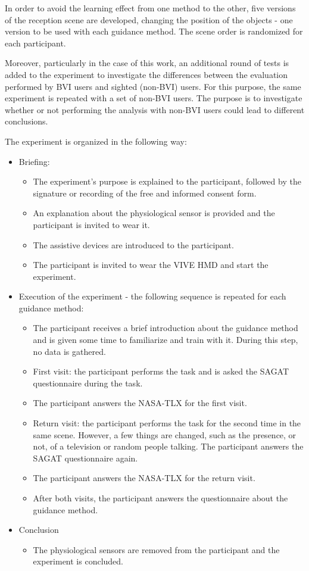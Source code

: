 In order to avoid the learning effect from one method to the other, five versions of the reception scene are developed, changing the position of the objects - one version to be used with each guidance method. The scene order is randomized for each participant.

Moreover, particularly in the case of this work, an additional round of tests is added to the experiment to investigate the differences between the evaluation performed by BVI users and sighted (non-BVI) users. For this purpose, the same experiment is repeated with a set of non-BVI users. The purpose is to investigate whether or not performing the analysis with non-BVI users could lead to different conclusions.

The experiment is organized in the following way:

\begin{itemize}
    \item Briefing:
    \begin{itemize}
        \item The experiment's purpose is explained to the participant, followed by the signature or recording of the free and informed consent form.
        \item An explanation about the physiological sensor is provided and the participant is invited to wear it.
        \item The assistive devices are introduced to the participant.
        \item The participant is invited to wear the VIVE HMD and start the experiment. 
    \end{itemize}
    \item Execution of the experiment - the following sequence is repeated for each guidance method:
    \begin{itemize}
        \item The participant receives a brief introduction about the guidance method and is given some time to familiarize and train with it. During this step, no data is gathered. 
        \item First visit: the participant performs the task and is asked the SAGAT questionnaire during the task.
        \item The participant answers the NASA-TLX for the first visit.
        \item Return visit: the participant performs the task for the second time in the same scene. However, a few things are changed, such as the presence, or not, of a television or random people talking. The participant answers the SAGAT questionnaire again.
        \item The participant answers the NASA-TLX for the return visit.
        \item After both visits, the participant answers the questionnaire about the guidance method.
    \end{itemize}
    \item Conclusion
    \begin{itemize}
        \item The physiological sensors are removed from the participant and the experiment is concluded.
    \end{itemize}
\end{itemize}

